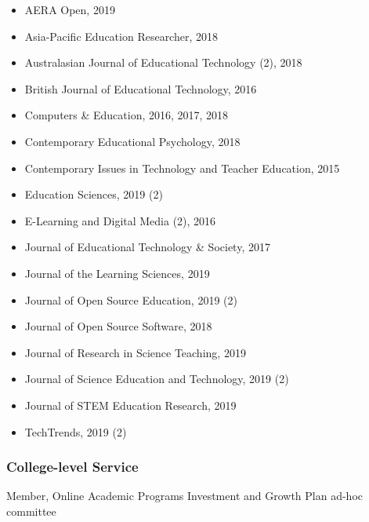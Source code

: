 \documentclass[14,]{article}
\providecommand{\tightlist}{%
  \setlength{\itemsep}{0pt}\setlength{\parskip}{0pt}}
\begin{document}
\begin{itemize}
\tightlist
\item
  AERA Open, 2019\\
\item
  Asia-Pacific Education Researcher, 2018\\
\item
  Australasian Journal of Educational Technology (2), 2018\\
\item
  British Journal of Educational Technology, 2016\\
\item
  Computers \& Education, 2016, 2017, 2018\\
\item
  Contemporary Educational Psychology, 2018\\
\item
  Contemporary Issues in Technology and Teacher Education, 2015\\
\item
  Education Sciences, 2019 (2)\\
\item
  E-Learning and Digital Media (2), 2016\\
\item
  Journal of Educational Technology \& Society, 2017\\
\item
  Journal of the Learning Sciences, 2019\\
\item
  Journal of Open Source Education, 2019 (2)
\item
  Journal of Open Source Software, 2018\\
\item
  Journal of Research in Science Teaching, 2019\\
\item
  Journal of Science Education and Technology, 2019 (2)
\item
  Journal of STEM Education Research, 2019
\item
  TechTrends, 2019 (2)
\end{itemize}

\hypertarget{college-level-service}{%
\subsubsection{College-level Service}\label{college-level-service}}

Member, Online Academic Programs Investment and Growth Plan ad-hoc
committee
\end{document}
